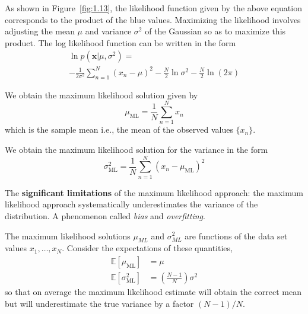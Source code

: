 \documentclass[5p,sort&compress]{elsarticle}
\begin{document}
As shown in Figure~\ref{fig:1.13}, the likelihood function given by the above equation corresponds to the product of the blue values. Maximizing the likelihood involves adjusting the mean $\mu$ and variance $\sigma^2$ of the Gaussian so as to maximize this product. The log likelihood function can be written in the form
\begin{equation}
\begin{aligned}{}\ln p\left(\mathbf{x} | \mu, \sigma^{2}\right) =\\
-\frac{1}{2 \sigma^{2}} \sum_{n=1}^{N}\left(x_{n}-\mu\right)^{2}-\frac{N}{2} \ln \sigma^{2}-\frac{N}{2} \ln (2 \pi)
\end{aligned}
\end{equation}

We obtain the maximum likelihood solution given by
\begin{equation}
\mu_{\mathrm{ML}}=\frac{1}{N} \sum_{n=1}^{N} x_{n}
\end{equation}
which is the sample mean i.e., the mean of the observed values $\{x_n\}$.

We obtain the maximum likelihood solution for the variance in the form
\begin{equation}
\sigma_{\mathrm{ML}}^{2}=\frac{1}{N} \sum_{n=1}^{N}\left(x_{n}-\mu_{\mathrm{ML}}\right)^{2}
\end{equation}

The \textbf{significant limitations} of the maximum likelihood approach: the maximum likelihood approach systematically underestimates the variance of the distribution. A phenomenon called \textit{bias} and \textit{overfitting}.

The maximum likelihood solutions $\mu_{ML}$ and $\sigma^2_{ML}$ are functions of the data set values $x_1, \ldots, x_N$. Consider the expectations of these quantities, 
\begin{equation}
\begin{aligned} \mathbb{E}\left[\mu_{\mathrm{ML}}\right] &=\mu \\ \mathbb{E}\left[\sigma_{\mathrm{ML}}^{2}\right] &=\left(\frac{N-1}{N}\right) \sigma^{2} \end{aligned}
\end{equation}
so that on average the maximum likelihood estimate will obtain the correct mean but will underestimate the true variance by a factor $(N-1)/N$.
\end{document}
